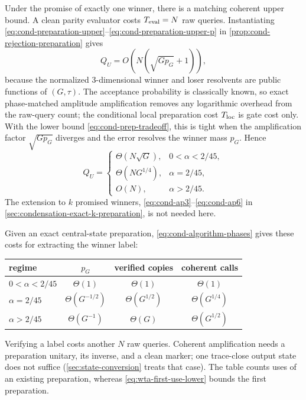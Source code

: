Under the promise of exactly one winner, there is a matching coherent
upper bound.  A clean parity evaluator costs $T_{\rm eval}=N$ raw queries.
Instantiating
\eqref{eq:cond-preparation-upper}--\eqref{eq:cond-preparation-upper-p} in
\cref{prop:cond-rejection-preparation} gives
\begin{equation}
 Q_U=O\!\left(N(\sqrt{Gp_G}+1)\right),
 \label{eq:wta-preparation-upper}
\end{equation}
because the normalized $3$-dimensional winner and loser resolvents are public
functions of $(G,\tau)$.  The acceptance probability is classically known,
so exact phase-matched amplitude amplification removes any logarithmic
overhead from the raw-query count; the conditional local preparation cost
$T_{\rm loc}$ is gate cost only.  With the lower bound
\eqref{eq:cond-prep-tradeoff}, this is tight when the amplification
factor $\sqrt{Gp_G}$ diverges and the error resolves the winner mass $p_G$.  Hence
\begin{equation}
 Q_U=\begin{cases}
 \Theta(N\sqrt G),&0<\alpha<2/45,\\
 \Theta(NG^{1/4}),&\alpha=2/45,\\
 O(N),&\alpha>2/45.
 \end{cases}
 \label{eq:wta-preparation-phases}
\end{equation}
The extension to $k$ promised winners,
\eqref{eq:cond-ap3}--\eqref{eq:cond-ap6} in
\cref{sec:condensation-exact-k-preparation}, is not needed here.

Given an exact central-state preparation,
\eqref{eq:cond-algorithm-phases} gives these costs for extracting the
winner label:
\begin{center}
\begin{tabular}{@{}lccc@{}}
\toprule
regime & $p_G$ & verified copies & coherent calls \\ \midrule
$0<\alpha<2/45$ & $\Theta(1)$ & $\Theta(1)$ & $\Theta(1)$ \\
$\alpha=2/45$ & $\Theta(G^{-1/2})$ & $\Theta(G^{1/2})$ & $\Theta(G^{1/4})$ \\
$\alpha>2/45$ & $\Theta(G^{-1})$ & $\Theta(G)$ & $\Theta(G^{1/2})$ \\
\bottomrule
\end{tabular}
\end{center}
Verifying a label costs another $N$ raw queries.  Coherent
amplification needs a preparation unitary, its inverse, and a clean marker;
one trace-close output state does not suffice
(\cref{sec:state-conversion} treats that case).  The table counts uses of an
existing preparation, whereas \eqref{eq:wta-first-use-lower} bounds the
first preparation.


